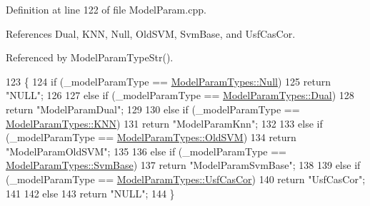 Definition at line 122 of file Model\+Param.\+cpp.



References Dual, K\+NN, Null, Old\+S\+VM, Svm\+Base, and Usf\+Cas\+Cor.



Referenced by Model\+Param\+Type\+Str().


\begin{DoxyCode}
123 \{
124   \textcolor{keywordflow}{if}  (\_modelParamType == \hyperlink{class_k_k_m_l_l_1_1_model_param_a5984a5fe225fdbe8e40fb5ec746a42d0abbb93ef26e3c101ff11cdd21cab08a94}{ModelParamTypes::Null})
125     \textcolor{keywordflow}{return} \textcolor{stringliteral}{"NULL"};
126   
127   \textcolor{keywordflow}{else} \textcolor{keywordflow}{if}  (\_modelParamType == \hyperlink{class_k_k_m_l_l_1_1_model_param_a5984a5fe225fdbe8e40fb5ec746a42d0acf53591af1208ddd535806600273099a}{ModelParamTypes::Dual})
128     \textcolor{keywordflow}{return} \textcolor{stringliteral}{"ModelParamDual"};
129 
130   \textcolor{keywordflow}{else} \textcolor{keywordflow}{if}  (\_modelParamType == \hyperlink{class_k_k_m_l_l_1_1_model_param_a5984a5fe225fdbe8e40fb5ec746a42d0ab602e23c0ec2466f3aa6cade0cd5ce05}{ModelParamTypes::KNN})
131     \textcolor{keywordflow}{return} \textcolor{stringliteral}{"ModelParamKnn"};
132 
133   \textcolor{keywordflow}{else} \textcolor{keywordflow}{if}  (\_modelParamType == \hyperlink{class_k_k_m_l_l_1_1_model_param_a5984a5fe225fdbe8e40fb5ec746a42d0a7a3ee72cc2709227d58fd2c189a2a58b}{ModelParamTypes::OldSVM})
134     \textcolor{keywordflow}{return} \textcolor{stringliteral}{"ModelParamOldSVM"};
135   
136   \textcolor{keywordflow}{else} \textcolor{keywordflow}{if}  (\_modelParamType == \hyperlink{class_k_k_m_l_l_1_1_model_param_a5984a5fe225fdbe8e40fb5ec746a42d0ac59ef2743d310cad5d7bbb7b53773bb4}{ModelParamTypes::SvmBase})
137     \textcolor{keywordflow}{return} \textcolor{stringliteral}{"ModelParamSvmBase"};
138 
139   \textcolor{keywordflow}{else} \textcolor{keywordflow}{if}  (\_modelParamType == \hyperlink{class_k_k_m_l_l_1_1_model_param_a5984a5fe225fdbe8e40fb5ec746a42d0ade699dc1790347a08d7060ab8078c71c}{ModelParamTypes::UsfCasCor})
140     \textcolor{keywordflow}{return}  \textcolor{stringliteral}{"UsfCasCor"};
141 
142   \textcolor{keywordflow}{else}
143     \textcolor{keywordflow}{return} \textcolor{stringliteral}{"NULL"};
144 \}
\end{DoxyCode}
